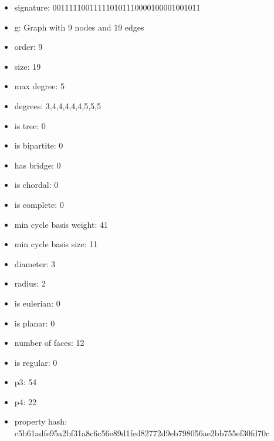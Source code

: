 \newpage
\begin{figure}
\end{figure}
\begin{itemize}
\item signature: 001111100111110101110000100001001011
\item g: Graph with 9 nodes and 19 edges
\item order: 9
\item size: 19
\item max degree: 5
\item degrees: 3,4,4,4,4,4,5,5,5
\item is tree: 0
\item is bipartite: 0
\item has bridge: 0
\item is chordal: 0
\item is complete: 0
\item min cycle basis weight: 41
\item min cycle basis size: 11
\item diameter: 3
\item radius: 2
\item is eulerian: 0
\item is planar: 0
\item number of faces: 12
\item is regular: 0
\item p3: 54
\item p4: 22
\item property hash: c5b61adfe95a2bf31a8c6c56e89d1fed82772d9eb798056ae2bb755ef30fd70c
\end{itemize}
